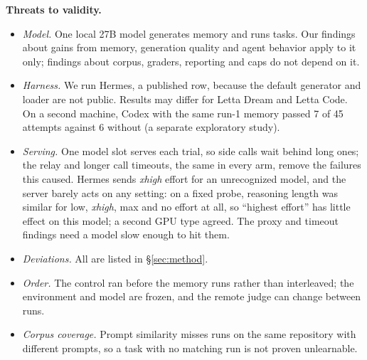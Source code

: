 \textbf{Threats to validity.}
\begin{itemize}
  \item \emph{Model.} One local 27B model generates memory and runs tasks. Our findings about gains from memory, generation quality and agent behavior apply to it only; findings about corpus, graders, reporting and caps do not depend on it.
  \item \emph{Harness.} We run Hermes, a published row, because the default generator and loader are not public. Results may differ for Letta Dream and Letta Code. On a second machine, Codex with the same run-1 memory passed 7 of 45 attempts against 6 without (a separate exploratory study).
  \item \emph{Serving.} One model slot serves each trial, so side calls wait behind long ones; the relay and longer call timeouts, the same in every arm, remove the failures this caused. Hermes sends \emph{xhigh} effort for an unrecognized model, and the server barely acts on any setting: on a fixed probe, reasoning length was similar for low, \emph{xhigh}, max and no effort at all, so ``highest effort'' has little effect on this model; a second GPU type agreed. The proxy and timeout findings need a model slow enough to hit them.
  \item \emph{Deviations.} All are listed in \S\ref{sec:method}.
  \item \emph{Order.} The control ran before the memory runs rather than interleaved; the environment and model are frozen, and the remote judge can change between runs.
  \item \emph{Corpus coverage.} Prompt similarity misses runs on the same repository with different prompts, so a task with no matching run is not proven unlearnable.
\end{itemize}
